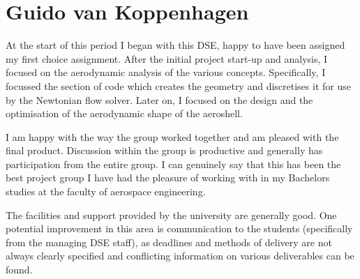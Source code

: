 
\section{Guido van Koppenhagen}
At the start of this period I began with this DSE, happy to have been assigned my first choice assignment. After the initial project start-up and analysis, I focused on the aerodynamic analysis of the various concepts. Specifically, I focussed the section of code which creates the geometry and discretises it for use by the Newtonian flow solver. Later on, I focused on the design and the optimisation of the aerodynamic shape of the aeroshell.  

I am happy with the way the group worked together and am pleased with the final product. Discussion within the group is productive and generally has participation from the entire group.  I can genuinely say that this has been the best project group I have had the pleasure of working with in my Bachelors studies at the faculty of aerospace engineering. 

The facilities and support provided by the university are generally good. One potential improvement in this area is communication to the students (specifically from the managing DSE staff), as deadlines and methods of delivery are not always clearly specified and conflicting information on various deliverables can be found.  
